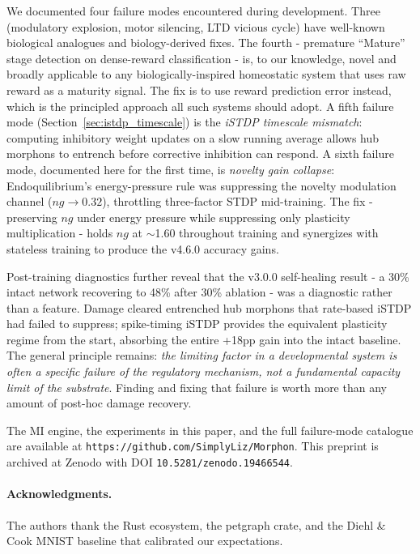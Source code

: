 We documented four failure modes encountered during development. Three (modulatory explosion, motor silencing, LTD vicious cycle) have well-known biological analogues and biology-derived fixes. The fourth - premature ``Mature'' stage detection on dense-reward classification - is, to our knowledge, novel and broadly applicable to any biologically-inspired homeostatic system that uses raw reward as a maturity signal. The fix is to use reward prediction error instead, which is the principled approach all such systems should adopt. A fifth failure mode (Section~\ref{sec:istdp_timescale}) is the \emph{iSTDP timescale mismatch}: computing inhibitory weight updates on a slow running average allows hub morphons to entrench before corrective inhibition can respond. A sixth failure mode, documented here for the first time, is \emph{novelty gain collapse}: Endoquilibrium's energy-pressure rule was suppressing the novelty modulation channel ($\mathit{ng} \rightarrow 0.32$), throttling three-factor STDP mid-training. The fix - preserving $\mathit{ng}$ under energy pressure while suppressing only plasticity multiplication - holds $\mathit{ng}$ at $\sim$1.60 throughout training and synergizes with stateless training to produce the v4.6.0 accuracy gains.

Post-training diagnostics further reveal that the v3.0.0 self-healing result - a 30\% intact network recovering to 48\% after 30\% ablation - was a diagnostic rather than a feature. Damage cleared entrenched hub morphons that rate-based iSTDP had failed to suppress; spike-timing iSTDP provides the equivalent plasticity regime from the start, absorbing the entire +18pp gain into the intact baseline. The general principle remains: \emph{the limiting factor in a developmental system is often a specific failure of the regulatory mechanism, not a fundamental capacity limit of the substrate}. Finding and fixing that failure is worth more than any amount of post-hoc damage recovery.

The MI engine, the experiments in this paper, and the full failure-mode catalogue are available at \texttt{https://github.com/SimplyLiz/Morphon}. This preprint is archived at Zenodo with DOI \texttt{10.5281/zenodo.19466544}.

\paragraph{Acknowledgments.}
The authors thank the Rust ecosystem, the petgraph crate, and the Diehl \& Cook MNIST baseline that calibrated our expectations.

